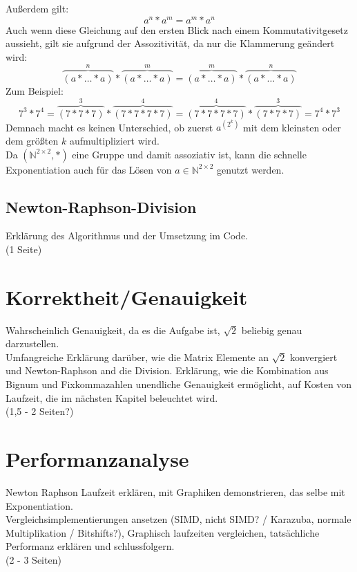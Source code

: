 \documentclass[course=erap]{aspdoc}
\begin{document}
Außerdem gilt:
\begin{equation}\label{swap_exponents}
      a^n*a^m = a^m*a^n
\end{equation}
Auch wenn diese Gleichung auf den ersten Blick nach einem Kommutativitgesetz aussieht, gilt sie aufgrund der Assozitivität, da nur die Klammerung geändert wird:
\[ \overbrace{(a*\dots*a)}^n*\overbrace{(a*\dots*a)}^m = \overbrace{(a*\dots*a)}^m*\overbrace{(a*\dots*a)}^n \]
Zum Beispiel:
\[ 7^3*7^4 = \overbrace{(7*7*7)}^3*\overbrace{(7*7*7*7)}^4 = \overbrace{(7*7*7*7)}^4*\overbrace{(7*7*7)}^3 = 7^4*7^3 \]
Demnach macht es keinen Unterschied, ob zuerst $a^{(2^k)}$ mit dem kleinsten oder dem größten $k$ aufmultipliziert wird.\\
Da $(\mathbb{N}^{2\times 2}, *)$ eine Gruppe und damit assoziativ ist, kann die schnelle Exponentiation auch für das Lösen von $a\in\mathbb{N}^{2\times 2}$ genutzt werden.
\subsection{Newton-Raphson-Division}
Erklärung des Algorithmus und der Umsetzung im Code. \cite{newton_raphson_division} \\
(1 Seite)

\section{Korrektheit/Genauigkeit}
Wahrscheinlich Genauigkeit, da es die Aufgabe ist, $\sqrt{2}$ beliebig genau darzustellen. \\

Umfangreiche Erklärung darüber, wie die Matrix Elemente an $\sqrt{2}$ konvergiert und Newton-Raphson and die Division. Erklärung, wie die Kombination aus Bignum und Fixkommazahlen unendliche Genauigkeit 
ermöglicht, auf Kosten von Laufzeit, die im nächsten Kapitel beleuchtet wird. \\ 
(1,5 - 2 Seiten?)

\section{Performanzanalyse}
Newton Raphson Laufzeit erklären, mit Graphiken demonstrieren, das selbe mit Exponentiation. \\
Vergleichsimplementierungen ansetzen (SIMD, nicht SIMD? / Karazuba, normale Multiplikation / Bitshifts?), Graphisch laufzeiten vergleichen, tatsächliche Performanz erklären und schlussfolgern. \\
(2 - 3 Seiten)
\end{document}
